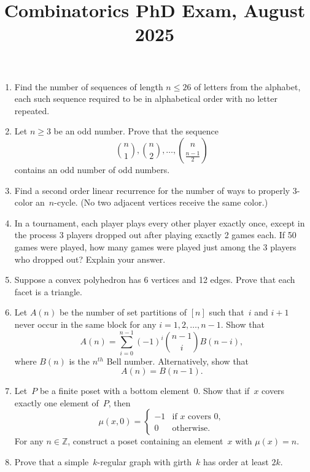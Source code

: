 \documentclass[11pt,letterpaper]{article}
\title{Combinatorics PhD Exam, August 2025}
\author{}
\date{}
\newenvironment{examproblems}[2]{%
  \def\ProblemHeadingTag{#2}%
  \AssignTaggingSocketPlug{block/list/label}{examproblem}%
  \begin{enumerate}%
  \setcounter{enumi}{#1}%
  \renewcommand{\labelenumi}{\textbf{\theenumi.}}%
  \setlength{\topsep}{0.35em}%
  \setlength{\partopsep}{0pt}%
  \setlength{\itemsep}{0.48em}%
  \setlength{\parsep}{0.18em}%
}{\end{enumerate}}
\begin{document}
\maketitle
\thispagestyle{empty}
\begin{examproblems}{0}{H2}
\def\ProblemHeadingText{Problem 1.}
\item
Find the number of sequences of length \(n \leq 26\) of letters from the alphabet, each such sequence required to be in alphabetical order with no letter repeated.
\def\ProblemHeadingText{Problem 2.}
\item
Let \(n \geq 3\) be an odd number. Prove that the sequence
\[
\binom{n}{1},\binom{n}{2},\ldots,\binom{n}{\frac{n-1}{2}}
\]
 contains an odd number of odd numbers.
\def\ProblemHeadingText{Problem 3.}
\item
Find a second order linear recurrence for the number of ways to properly 3-color an~\(n\)-cycle. (No two adjacent vertices receive the same color.)
\def\ProblemHeadingText{Problem 4.}
\item
In a tournament, each player plays every other player exactly once, except in the process 3 players dropped out after playing exactly 2 games each. If 50 games were played, how many games were played just among the 3 players who dropped out? Explain your answer.
\def\ProblemHeadingText{Problem 5.}
\item
Suppose a convex polyhedron has 6 vertices and 12 edges. Prove that each facet is a triangle.
\def\ProblemHeadingText{Problem 6.}
\item
Let \(A(n)\) be the number of set partitions of \([n]\) such that~\(i\) and \(i+1\) never occur in the same block for any \(i=1,2,\ldots,n-1\). Show that
\[
A(n)=\sum_{i=0}^{n-1}(-1)^i\binom{n-1}{i}B(n-i),
\]
 where \(B(n)\) is the \(n^{th}\) Bell number. Alternatively, show that
\[
A(n)=B(n-1).
\]
\def\ProblemHeadingText{Problem 7.}
\item
Let~\(P\) be a finite poset with a bottom element~\(0\). Show that if~\(x\) covers exactly one element of~\(P\), then
\[
\mu(x,0)=
\begin{cases}
-1 & \text{if }x\text{ covers }0,\\
0 & \text{otherwise.}
\end{cases}
\]
 For any \(n\in\mathbb{Z}\), construct a poset containing an element~\(x\) with \(\mu(x)=n\).
\def\ProblemHeadingText{Problem 8.}
\item
Prove that a simple~\(k\)-regular graph with girth~\(k\) has order at least \(2k\).
\end{examproblems}
\end{document}
